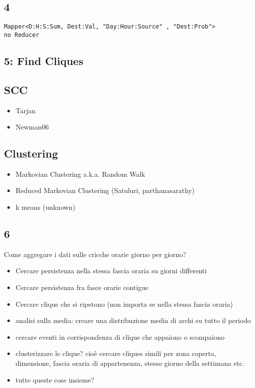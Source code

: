 \documentclass[10pt,a4paper]{article}
\begin{document}
\subsection{4}
\begin{verbatim}
Mapper<D:H:S:Sum, Dest:Val, "Day:Hour:Source" , "Dest:Prob">
no Reducer
\end{verbatim}

\subsection{5: Find Cliques}

\subsection{SCC}
\begin{itemize}
\item Tarjan
\item Newman06
\end{itemize}

\subsection{Clustering}
\begin{itemize}
\item Markovian Clustering a.k.a. Random Walk
\item Reduced Markovian Clustering (Satuluri, parthanasarathy)
\item k means (unknown)

\end{itemize}
\subsection{6}

Come aggregare i dati sulle cricche orarie giorno per giorno?
\begin{itemize}
\item Cercare persistenza nella stessa fascia oraria su giorni differenti
\item Cercare persistenza fra fasce orarie contigue
\item Cercare clique che si ripetono (non importa se nella stessa fascia oraria)
\item analisi sulla media: creare una distribuzione media di archi su tutto il periodo
\item cercare eventi in corrispondenza di clique che appaiono o scompaiono
\item clusterizzare le clique? cioè cercare cliques simili per zona coperta, dimensione, fascia oraria
di appartenenza, stesso giorno della settimana etc.
\item tutte queste cose insieme?
\end{itemize}
\end{document}
